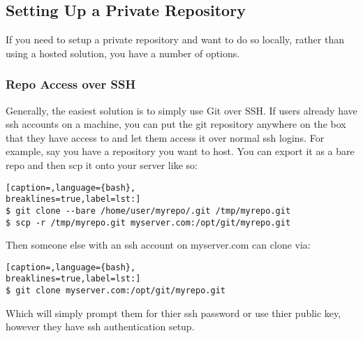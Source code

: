 \subsection{Setting Up a Private Repository}
If you need to setup a private repository and want to do so locally, rather
than using a hosted solution, you have a number of options.

\subsubsection{Repo Access over SSH}
Generally, the easiest solution is to simply use Git over SSH. If users already
have ssh accounts on a machine, you can put the git repository anywhere on the
box that they have access to and let them access it over normal ssh logins. For
example, say you have a repository you want to host. You can export it as a
bare repo and then scp it onto your server like so:
\lstset{basicstyle=\scriptsize, numbers=none, captionpos=b, tabsize=4}
\begin{lstlisting}[caption=,language={bash},
breaklines=true,label=lst:]
$ git clone --bare /home/user/myrepo/.git /tmp/myrepo.git
$ scp -r /tmp/myrepo.git myserver.com:/opt/git/myrepo.git
\end{lstlisting}

Then someone else with an ssh account on myserver.com can clone via:
\lstset{basicstyle=\scriptsize, numbers=none, captionpos=b, tabsize=4}
\begin{lstlisting}[caption=,language={bash},
breaklines=true,label=lst:]
$ git clone myserver.com:/opt/git/myrepo.git
\end{lstlisting}

Which will simply prompt them for thier ssh password or use thier public key,
however they have ssh authentication setup.
